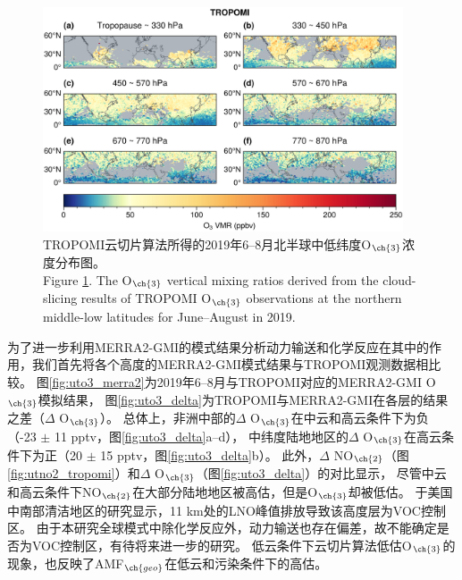 \begin{figure}[H]
    \centering
    \includegraphics[width=0.95\textwidth]{./figures/uto3_tropomi.png}
    \caption{
    TROPOMI云切片算法所得的2019年6--8月北半球中低纬度O$_{\ch{3}}$浓度分布图。 \\
    Figure \ref{fig:uto3_tropomi}. The O$_{\ch{3}}$ vertical mixing ratios derived from the cloud-slicing results of TROPOMI O$_{\ch{3}}$ observations at the northern middle-low latitudes for June--August in 2019.
    }
    \label{fig:uto3_tropomi}
\end{figure}

为了进一步利用MERRA2-GMI的模式结果分析动力输送和化学反应在其中的作用，我们首先将各个高度的MERRA2-GMI模式结果与TROPOMI观测数据相比较。
图\ref{fig:uto3_merra2}为2019年6--8月与TROPOMI对应的MERRA2-GMI O$_{\ch{3}}$模拟结果，
图\ref{fig:uto3_delta}为TROPOMI与MERRA2-GMI在各层的结果之差（$\Delta$ O$_{\ch{3}}$）。
总体上，非洲中部的$\Delta$ O$_{\ch{3}}$在中云和高云条件下为负（-23 $\pm$ 11 pptv，图\ref{fig:uto3_delta}a--d），
中纬度陆地地区的$\Delta$ O$_{\ch{3}}$在高云条件下为正（20 $\pm$ 15 pptv，图\ref{fig:uto3_delta}b）。
此外，$\Delta$ NO$_{\ch{2}}$（图\ref{fig:utno2_tropomi}）和$\Delta$ O$_{\ch{3}}$（图\ref{fig:uto3_delta}）的对比显示，
尽管中云和高云条件下NO$_{\ch{2}}$在大部分陆地地区被高估，但是O$_{\ch{3}}$却被低估。
\citet{Pickering.1990}于美国中南部清洁地区的研究显示，11 km处的LNO峰值排放导致该高度层为VOC控制区。
由于本研究全球模式中除化学反应外，动力输送也存在偏差，故不能确定是否为VOC控制区，有待将来进一步的研究。
低云条件下云切片算法低估O$_{\ch{3}}$的现象，也反映了AMF$_{\ch{geo}}$在低云和污染条件下的高估\citep{BelmonteRivas.2015}。

